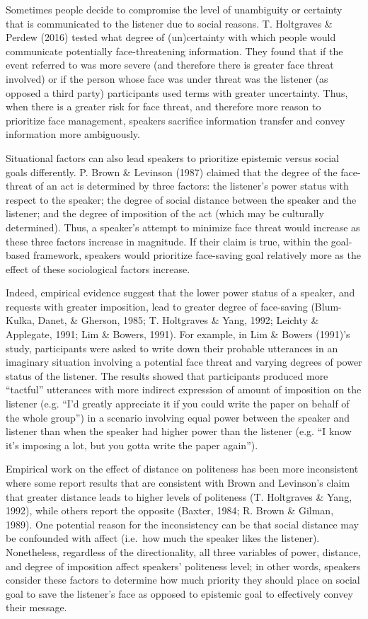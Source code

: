 \documentclass[oneside]{report}
\begin{document}
Sometimes people decide to compromise the level of unambiguity or
certainty that is communicated to the listener due to social reasons. T.
Holtgraves \& Perdew (2016) tested what degree of (un)certainty with
which people would communicate potentially face-threatening information.
They found that if the event referred to was more severe (and therefore
there is greater face threat involved) or if the person whose face was
under threat was the listener (as opposed a third party) participants
used terms with greater uncertainty. Thus, when there is a greater risk
for face threat, and therefore more reason to prioritize face
management, speakers sacrifice information transfer and convey
information more ambiguously.

Situational factors can also lead speakers to prioritize epistemic
versus social goals differently. P. Brown \& Levinson (1987) claimed
that the degree of the face-threat of an act is determined by three
factors: the listener's power status with respect to the speaker; the
degree of social distance between the speaker and the listener; and the
degree of imposition of the act (which may be culturally determined).
Thus, a speaker's attempt to minimize face threat would increase as
these three factors increase in magnitude. If their claim is true,
within the goal-based framework, speakers would prioritize face-saving
goal relatively more as the effect of these sociological factors
increase.

Indeed, empirical evidence suggest that the lower power status of a
speaker, and requests with greater imposition, lead to greater degree of
face-saving (Blum-Kulka, Danet, \& Gherson, 1985; T. Holtgraves \& Yang,
1992; Leichty \& Applegate, 1991; Lim \& Bowers, 1991). For example, in
Lim \& Bowers (1991)'s study, participants were asked to write down
their probable utterances in an imaginary situation involving a
potential face threat and varying degrees of power status of the
listener. The results showed that participants produced more ``tactful''
utterances with more indirect expression of amount of imposition on the
listener (e.g. ``I'd greatly appreciate it if you could write the paper
on behalf of the whole group'') in a scenario involving equal power
between the speaker and listener than when the speaker had higher power
than the listener (e.g. ``I know it's imposing a lot, but you gotta
write the paper again'').

Empirical work on the effect of distance on politeness has been more
inconsistent where some report results that are consistent with Brown
and Levinson's claim that greater distance leads to higher levels of
politeness (T. Holtgraves \& Yang, 1992), while others report the
opposite (Baxter, 1984; R. Brown \& Gilman, 1989). One potential reason
for the inconsistency can be that social distance may be confounded with
affect (i.e.~how much the speaker likes the listener). Nonetheless,
regardless of the directionality, all three variables of power,
distance, and degree of imposition affect speakers' politeness level; in
other words, speakers consider these factors to determine how much
priority they should place on social goal to save the listener's face as
opposed to epistemic goal to effectively convey their message.
\end{document}
